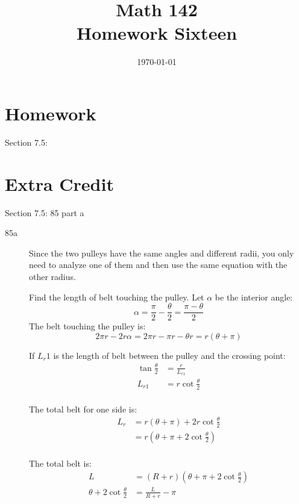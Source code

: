 \documentclass{exam}
\author{}
\date{\today}
\title{Math 142 \\ Homework Sixteen}
\begin{document}
  \maketitle

  \section{Homework}
  Section 7.5:

  \section{Extra Credit}
  Section 7.5: 85 part a

  \ifprintanswers
    \begin{description}
      \item[85a]
        Since the two pulleys have the same angles and different radii, you only need to analyze one of them and then
        use the same equation with the other radius.

        Find the length of belt touching the pulley.  Let $\alpha$ be the interior angle:
        \[
          \alpha = \frac{\pi}{2} - \frac{\theta}{2} = \frac{\pi - \theta}{2}
        \]
        The belt touching the pulley is:
        \[
          2 \pi r - 2r \alpha = 2 \pi r - \pi r - \theta r = r (\theta + \pi)
        \]

        If $L_r1$ is the length of belt between the pulley and the crossing point:
        \begin{align*}
          \tan \frac{\theta}{2} & = \frac{r}{L_{r1}} \\
          L_{r1}                & = r \cot \frac{\theta}{2} \\
        \end{align*}

        The total belt for one side is:
        \begin{align*}
          L_r & = r (\theta + \pi) + 2 r \cot \frac{\theta}{2} \\
              & = r \left( \theta + \pi + 2 \cot \frac{\theta}{2} \right) \\
        \end{align*}

        The total belt is:
        \begin{align*}
          L                                 & = (R + r) \left( \theta + \pi + 2 \cot \frac{\theta}{2} \right) \\
          \theta  + 2 \cot \frac{\theta}{2} & = \frac{L}{R + r} - \pi \\
        \end{align*}

    \end{description}
\end{document}
